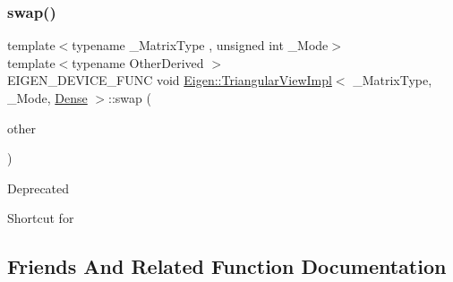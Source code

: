 \subsubsection{\texorpdfstring{swap()}{swap()}\hspace{0.1cm}{\footnotesize\ttfamily [2/2]}}
{\footnotesize\ttfamily template$<$typename \+\_\+\+Matrix\+Type , unsigned int \+\_\+\+Mode$>$ \\
template$<$typename Other\+Derived $>$ \\
E\+I\+G\+E\+N\+\_\+\+D\+E\+V\+I\+C\+E\+\_\+\+F\+U\+NC void \mbox{\hyperlink{class_eigen_1_1_triangular_view_impl}{Eigen\+::\+Triangular\+View\+Impl}}$<$ \+\_\+\+Matrix\+Type, \+\_\+\+Mode, \mbox{\hyperlink{struct_eigen_1_1_dense}{Dense}} $>$\+::swap (\begin{DoxyParamCaption}\item[{\mbox{\hyperlink{class_eigen_1_1_matrix_base}{Matrix\+Base}}$<$ Other\+Derived $>$ const \&}]{other }\end{DoxyParamCaption})\hspace{0.3cm}{\ttfamily [inline]}}

\begin{DoxyRefDesc}{Deprecated}
\item[\mbox{\hyperlink{deprecated__deprecated000011}{Deprecated}}]Shortcut for\end{DoxyRefDesc}

\begin{DoxyCode}{0}
\end{DoxyCode}
 

\subsection{Friends And Related Function Documentation}
\mbox{\label{class_eigen_1_1_triangular_view_impl_3_01___matrix_type_00_01___mode_00_01_dense_01_4_a2d454ef19893aa36d5dbb7f7c455e4b7}} 

